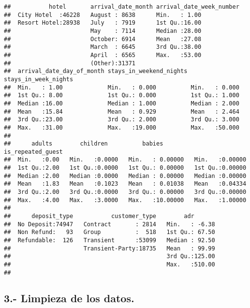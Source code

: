 \documentclass[]{article}
\begin{document}
\begin{verbatim}
##           hotel       arrival_date_month arrival_date_week_number
##  City Hotel  :46228   August : 8638      Min.   : 1.00           
##  Resort Hotel:28938   July   : 7919      1st Qu.:16.00           
##                       May    : 7114      Median :28.00           
##                       October: 6914      Mean   :27.08           
##                       March  : 6645      3rd Qu.:38.00           
##                       April  : 6565      Max.   :53.00           
##                       (Other):31371                              
##  arrival_date_day_of_month stays_in_weekend_nights stays_in_week_nights
##  Min.   : 1.00             Min.   : 0.000          Min.   : 0.000      
##  1st Qu.: 8.00             1st Qu.: 0.000          1st Qu.: 1.000      
##  Median :16.00             Median : 1.000          Median : 2.000      
##  Mean   :15.84             Mean   : 0.929          Mean   : 2.464      
##  3rd Qu.:23.00             3rd Qu.: 2.000          3rd Qu.: 3.000      
##  Max.   :31.00             Max.   :19.000          Max.   :50.000      
##                                                                        
##      adults        children          babies         is_repeated_guest
##  Min.   :0.00   Min.   :0.0000   Min.   : 0.00000   Min.   :0.00000  
##  1st Qu.:2.00   1st Qu.:0.0000   1st Qu.: 0.00000   1st Qu.:0.00000  
##  Median :2.00   Median :0.0000   Median : 0.00000   Median :0.00000  
##  Mean   :1.83   Mean   :0.1023   Mean   : 0.01038   Mean   :0.04334  
##  3rd Qu.:2.00   3rd Qu.:0.0000   3rd Qu.: 0.00000   3rd Qu.:0.00000  
##  Max.   :4.00   Max.   :3.0000   Max.   :10.00000   Max.   :1.00000  
##                                                                      
##      deposit_type           customer_type        adr        
##  No Deposit:74947   Contract       : 2814   Min.   : -6.38  
##  Non Refund:   93   Group          :  518   1st Qu.: 67.50  
##  Refundable:  126   Transient      :53099   Median : 92.50  
##                     Transient-Party:18735   Mean   : 99.99  
##                                             3rd Qu.:125.00  
##                                             Max.   :510.00  
## 
\end{verbatim}

\hypertarget{limpieza-de-los-datos.}{%
\subsection{3.- Limpieza de los datos.}\label{limpieza-de-los-datos.}}
\end{document}
